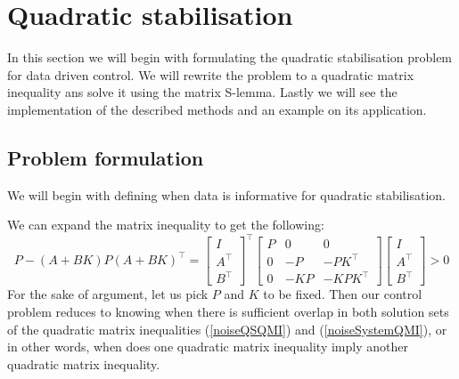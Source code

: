 \section{Quadratic stabilisation} \label{SectionQuadStab}
In this section we will begin with formulating the quadratic stabilisation problem for data driven control. We will rewrite the problem to a quadratic matrix inequality ans solve it using the matrix S-lemma. Lastly we will see the implementation of the described methods and an example on its application.

\subsection{Problem formulation}
We will begin with defining when data is informative for quadratic stabilisation. %


We can expand the matrix inequality to get the following:
\begin{equation} \label{noiseQSQMI}
P - (A + BK) P (A + BK)^\top = 
\begin{bmatrix} I\\A^\top\\B^\top \end{bmatrix}^\top 
\begin{bmatrix} P&0&0\\0&-P&-PK^\top\\0&-KP&-KPK^\top \end{bmatrix} 
\begin{bmatrix} I\\A^\top\\B^\top \end{bmatrix} > 0
\end{equation}
For the sake of argument, let us pick $P$ and $K$ to be fixed. Then our control problem reduces to knowing when there is sufficient overlap in both solution sets of the quadratic matrix inequalities (\ref{noiseQSQMI}) and (\ref{noiseSystemQMI}), or in other words, when does one quadratic matrix inequality imply another quadratic matrix inequality.



